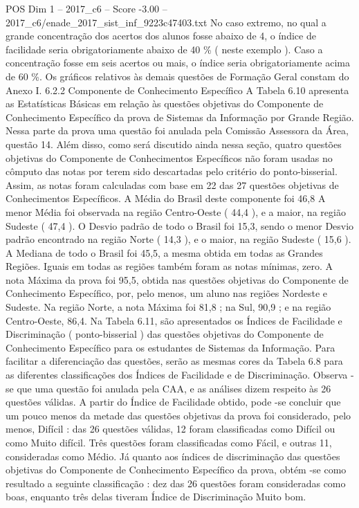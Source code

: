 \begin{textsample}{POS Dim 1 – 2017\_c6 – Score -3.00 – 2017\_c6/enade\_2017\_sist\_inf\_9223c47403.txt}
No caso extremo, no qual a grande concentração dos acertos dos alunos fosse abaixo de 4, o índice de facilidade seria obrigatoriamente abaixo de 40 \% ( neste exemplo ).
Caso a concentração fosse em seis acertos ou mais, o índice seria obrigatoriamente acima de 60 \%.
Os gráficos relativos às demais questões de Formação Geral constam do Anexo I. 6.2.2 Componente de Conhecimento Específico A Tabela 6.10 apresenta as Estatísticas Básicas em relação às questões objetivas do Componente de Conhecimento Específico da prova de Sistemas da Informação por Grande Região.
Nessa parte da prova uma questão foi anulada pela Comissão Assessora da Área, questão 14.
Além disso, como será discutido ainda nessa seção, quatro questões objetivas do Componente de Conhecimentos Específicos não foram usadas no cômputo das notas por terem sido descartadas pelo critério do ponto-bisserial.
Assim, as notas foram calculadas com base em 22 das 27 questões objetivas de Conhecimentos Específicos.
A Média do Brasil deste componente foi 46,8 A menor Média foi observada na região Centro-Oeste ( 44,4 ), e a maior, na região Sudeste ( 47,4 ).
O Desvio padrão de todo o Brasil foi 15,3, sendo o menor Desvio padrão encontrado na região Norte ( 14,3 ), e o maior, na região Sudeste ( 15,6 ).
A Mediana de todo o Brasil foi 45,5, a mesma obtida em todas as Grandes Regiões.
Iguais em todas as regiões também foram as notas mínimas, zero.
A nota Máxima da prova foi 95,5, obtida nas questões objetivas do Componente de Conhecimento Específico, por, pelo menos, um aluno nas regiões Nordeste e Sudeste.
Na região Norte, a nota Máxima foi 81,8 ; na Sul, 90,9 ; e na região Centro-Oeste, 86,4.
Na Tabela 6.11, são apresentados os Índices de Facilidade e Discriminação ( ponto-bisserial ) das questões objetivas do Componente de Conhecimento Específico para os estudantes de Sistemas da Informação.
Para facilitar a diferenciação das questões, serão as mesmas cores da Tabela 6.8 para as diferentes classificações dos Índices de Facilidade e de Discriminação.
Observa -se que uma questão foi anulada pela CAA, e as análises dizem respeito às 26 questões válidas.
A partir do Índice de Facilidade obtido, pode -se concluir que um pouco menos da metade das questões objetivas da prova foi considerado, pelo menos, Difícil : das 26 questões válidas, 12 foram classificadas como Difícil ou como Muito difícil.
Três questões foram classificadas como Fácil, e outras 11, consideradas como Médio.
Já quanto aos índices de discriminação das questões objetivas do Componente de Conhecimento Específico da prova, obtém -se como resultado a seguinte classificação : dez das 26 questões foram consideradas como boas, enquanto três delas tiveram Índice de Discriminação Muito bom.

\end{textsample}
